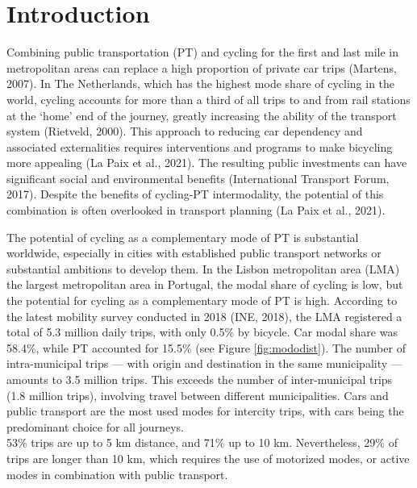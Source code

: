 \documentclass[review, doubleblind, 3p,
authoryear]{elsarticle} %
\begin{document}
\hypertarget{introduction}{%
\section{Introduction}\label{introduction}}

Combining public transportation (PT) and cycling for the first and last
mile in metropolitan areas can replace a high proportion of private car
trips (Martens, 2007). In The Netherlands, which has the highest mode
share of cycling in the world, cycling accounts for more than a third of
all trips to and from rail stations at the `home' end of the journey,
greatly increasing the ability of the transport system (Rietveld, 2000).
This approach to reducing car dependency and associated externalities
requires interventions and programs to make bicycling more appealing (La
Paix et al., 2021). The resulting public investments can have
significant social and environmental benefits (International Transport
Forum, 2017). Despite the benefits of cycling-PT intermodality, the
potential of this combination is often overlooked in transport planning
(La Paix et al., 2021).

The potential of cycling as a complementary mode of PT is substantial
worldwide, especially in cities with established public transport
networks or substantial ambitions to develop them. In the Lisbon
metropolitan area (LMA) the largest metropolitan area in Portugal, the
modal share of cycling is low, but the potential for cycling as a
complementary mode of PT is high. According to the latest mobility
survey conducted in 2018 (INE, 2018), the LMA registered a total of 5.3
million daily trips, with only 0.5\% by bicycle. Car modal share was
58.4\%, while PT accounted for 15.5\% (see Figure \ref{fig:mododist}).
The number of intra-municipal trips --- with origin and destination in
the same municipality --- amounts to 3.5 million trips. This exceeds the
number of inter-municipal trips (1.8 million trips), involving travel
between different municipalities. Cars and public transport are the most
used modes for intercity trips, with cars being the predominant choice
for all journeys.\\
53\% trips are up to 5 km distance, and 71\% up to 10 km. Nevertheless,
29\% of trips are longer than 10 km, which requires the use of motorized
modes, or active modes in combination with public transport.
\end{document}
